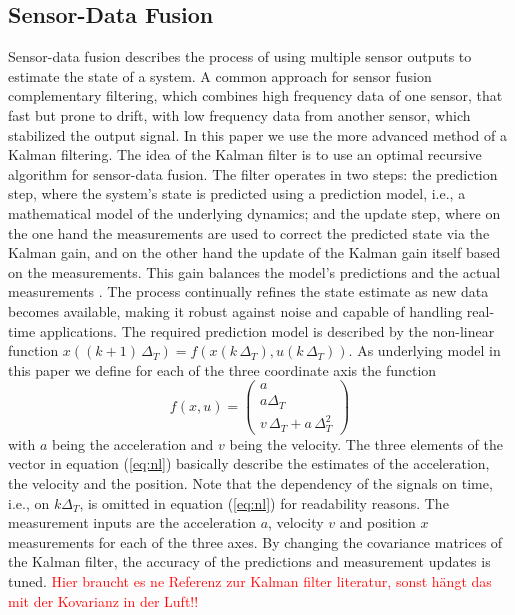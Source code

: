 \documentclass[engproc,conferenceproceedings,submit,pdftex,moreauthors]{Definitions/mdpi}
\begin{document}
\subsection{Sensor-Data Fusion}
Sensor-data fusion describes the process of using multiple sensor outputs to estimate the state of a system. A common approach for sensor fusion complementary filtering, which combines high frequency data of one sensor, that fast but prone to drift, with low frequency data from another sensor, which stabilized the output signal.
In this paper we use the more advanced method of a Kalman filtering. The idea of the Kalman filter is to use an optimal recursive algorithm  for sensor-data fusion. The filter operates in two steps: the prediction step, where the system's state  is predicted using a prediction model, i.e., a mathematical model of the underlying dynamics; and the update step, where on the one hand the measurements are used to correct the predicted state via the Kalman gain, and on the other hand the update of the Kalman gain itself based on the measurements. This gain balances the model's predictions and the actual measurements \cite{chui2009}. The process continually refines the state estimate as new data becomes available, making it robust against noise and capable of handling real-time applications. The required prediction model is described by  the non-linear function $x((k+1)\,\Delta_T) = f(x(k\,\Delta_T),u(k\,\Delta_T))$. As underlying model in this paper we define for each of the three coordinate  axis the function 
\begin{equation}\label{eq:nl}
	f(x,u) = \begin{pmatrix}
		a \\
		a \Delta_T   \\
		v \, \Delta_T   + a \, \Delta_T^2  
		\end{pmatrix}
\end{equation}
with $a$ being the acceleration and $v$ being the velocity. The three elements of the vector in equation (\ref{eq:nl}) basically describe the estimates of the  acceleration, the velocity and the position.
Note that the dependency of the signals on time, i.e., on $k\Delta_T$, is omitted in equation (\ref{eq:nl}) for readability reasons.
 The measurement inputs are the acceleration $a$, velocity $v$ and position $x$ measurements for each of the three axes. By changing the covariance matrices of the Kalman filter, the accuracy of the predictions and measurement updates is tuned. \textcolor{red}{Hier braucht es ne Referenz zur Kalman filter literatur, sonst hängt das mit der Kovarianz in der Luft!!} \\
\end{document}
